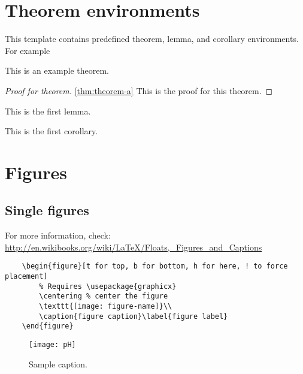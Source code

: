 \section{Theorem environments}
This template contains predefined theorem, lemma, and corollary environments. For example
\begin{theorem}\label{thm:theorem-a}
    This is an example theorem.
\end{theorem}
\begin{proof}[Proof for theorem] \ref{thm:theorem-a}
    This is the proof for this theorem.
\end{proof}
\begin{lemma}
    This is the first lemma.
\end{lemma}
\begin{corollary}
    This is the first corollary.
\end{corollary}

\newpage
\section{Figures}
\subsection{Single figures}
For more information, check: \href{http://en.wikibooks.org/wiki/LaTeX/Floats,_Figures_and_Captions}{http://en.wikibooks.org/wiki/LaTeX/Floats,\_Figures\_and\_Captions}
\begin{verbatim}
    \begin{figure}[t for top, b for bottom, h for here, ! to force placement]
        % Requires \usepackage{graphicx}
        \centering % center the figure
        \texttt{[image: figure-name]}\\
        \caption{figure caption}\label{figure label}
    \end{figure}
\end{verbatim}
\begin{figure}[h!]
  \centering
  \texttt{[image: pH]}\\
  \caption{Sample caption.}\label{label}
\end{figure}
\newpage
